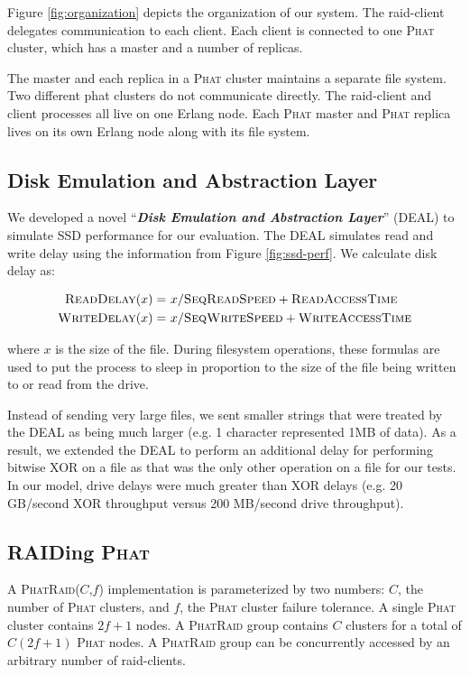 \documentclass[10pt,letter]{article}
\newcommand{\phat}[0]{\textsc{Phat}}
\newcommand{\phatraid}[0]{\textsc{PhatRaid}}
\newcommand{\phatraidcf}[2]{\textsc{PhatRaid}(#1,#2)}
\begin{document}
Figure \ref{fig:organization} depicts the organization of our system. The
raid-client delegates communication to each client. Each client is connected to
one \phat{} cluster, which has a master and a number of replicas.

The master and each replica in a \phat{} cluster maintains a separate
file system. Two different phat clusters do not communicate
directly. The raid-client and client processes all live on one Erlang
node. Each \phat{} master and \phat{} replica lives on its own Erlang
node along with its file system.

\subsection{Disk Emulation and Abstraction Layer}

We developed a novel ``{\bf {\em Disk Emulation and Abstraction Layer}}'' (DEAL)
to simulate SSD performance for our evaluation. The DEAL simulates read and 
write delay using the information from Figure \ref{fig:ssd-perf}. We calculate disk delay as:

\begin{align}
\textsc{ReadDelay}(x) =&\ x / \textsc{SeqReadSpeed} + \textsc{ReadAccessTime}\\
\textsc{WriteDelay}(x) =&\ x / \textsc{SeqWriteSpeed} + \textsc{WriteAccessTime}
\end{align}

where $x$ is the size of the file. During filesystem operations, these formulas are
used to put the process to sleep in proportion to the size of the file being written to
or read from the drive. 

Instead of sending very large files, we sent smaller strings that were treated by the 
DEAL as being much larger (e.g. 1 character represented 1MB of data). As a result,
we extended the DEAL to perform an additional delay for performing bitwise XOR
on a file as that was the only other operation on a file for our tests. 
In our model, drive delays were much greater than XOR delays (e.g. 20 GB/second 
XOR throughput versus 200 MB/second drive throughput).

\subsection{RAIDing \phat{}}

A \phatraidcf{$C$}{$f$} implementation is parameterized by two numbers: $C$, the
number of \phat{} clusters, and $f$, the \phat{} cluster failure tolerance. A
single \phat{} cluster contains $2f + 1$ nodes. A \phatraid{} group contains $C$
clusters for a total of $C(2f+1)$ \phat{} nodes. A \phatraid{} group can be
concurrently accessed by an arbitrary number of raid-clients.
\end{document}
